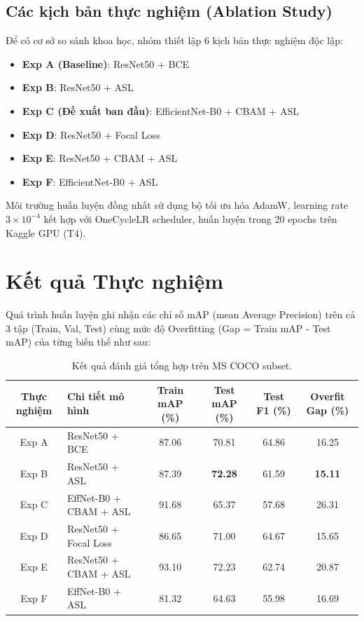 \documentclass{article}
\begin{document}
\subsection{Các kịch bản thực nghiệm (Ablation Study)}
Để có cơ sở so sánh khoa học, nhóm thiết lập 6 kịch bản thực nghiệm độc lập:
\begin{itemize}
    \item \textbf{Exp A (Baseline)}: ResNet50 + BCE
    \item \textbf{Exp B}: ResNet50 + ASL
    \item \textbf{Exp C (Đề xuất ban đầu)}: EfficientNet-B0 + CBAM + ASL
    \item \textbf{Exp D}: ResNet50 + Focal Loss
    \item \textbf{Exp E}: ResNet50 + CBAM + ASL
    \item \textbf{Exp F}: EfficientNet-B0 + ASL
\end{itemize}
Môi trường huấn luyện đồng nhất sử dụng bộ tối ưu hóa AdamW, learning rate $3 \times 10^{-4}$ kết hợp với OneCycleLR scheduler, huấn luyện trong 20 epochs trên Kaggle GPU (T4).

\section{Kết quả Thực nghiệm}

Quá trình huấn luyện ghi nhận các chỉ số mAP (mean Average Precision) trên cả 3 tập (Train, Val, Test) cùng mức độ Overfitting (Gap = Train mAP - Test mAP) của từng biến thể như sau:

\begin{table}[H]
  \caption{Kết quả đánh giá tổng hợp trên MS COCO subset.}
  \label{tab:results}
  \centering
  \begin{tabular}{clcccc}
    \toprule
    \textbf{Thực nghiệm} & \textbf{Chi tiết mô hình} & \textbf{Train mAP (\%)} & \textbf{Test mAP (\%)} & \textbf{Test F1 (\%)} & \textbf{Overfit Gap (\%)}\\
    \midrule
    Exp A & ResNet50 + BCE       & 87.06 & 70.81 & 64.86 & 16.25 \\
    Exp B & ResNet50 + ASL       & 87.39 & \textbf{72.28} & 61.59 & \textbf{15.11} \\
    Exp C & EffNet-B0 + CBAM + ASL & 91.68 & 65.37 & 57.68 & 26.31 \\
    Exp D & ResNet50 + Focal Loss & 86.65 & 71.00 & 64.67 & 15.65 \\
    Exp E & ResNet50 + CBAM + ASL & 93.10 & 72.23 & 62.74 & 20.87 \\
    Exp F & EffNet-B0 + ASL      & 81.32 & 64.63 & 55.98 & 16.69 \\
    \bottomrule
  \end{tabular}
\end{table}
\end{document}
